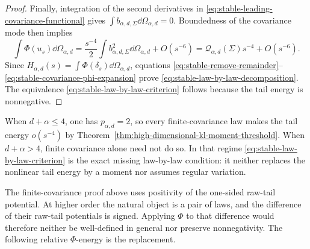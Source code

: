 \begin{proof}
Finally, integration of the second derivatives in
\eqref{eq:stable-leading-covariance-functional} gives
\(\int b_{\alpha,d,\Sigma}\dd\Omega_{\alpha,d}=0\).  Boundedness of the
covariance mode then implies
\begin{equation}\label{eq:stable-covariance-phi-expansion}
 \int\Phi(u_s)\dd\Omega_{\alpha,d}
 =\frac{s^{-4}}2\int b_{\alpha,d,\Sigma}^2\dd\Omega_{\alpha,d}
 +O(s^{-6})
 =\mathcal Q_{\alpha,d}(\Sigma)s^{-4}+O(s^{-6}).
\end{equation}
Since \(H_{\alpha,d}(s)=\int\Phi(\delta_s)\dd\Omega_{\alpha,d}\),
equations \eqref{eq:stable-remove-remainder}--
\eqref{eq:stable-covariance-phi-expansion} prove
\eqref{eq:stable-law-by-law-decomposition}.  The equivalence
\eqref{eq:stable-law-by-law-criterion} follows because the tail energy is
nonnegative.
\end{proof}

\begin{remark}
When \(d+\alpha\le4\), one has \(p_{\alpha,d}=2\), so every
finite-covariance law makes the tail energy \(o(s^{-4})\) by
Theorem~\ref{thm:high-dimensional-kl-moment-threshold}.  When
\(d+\alpha>4\), finite covariance alone need not do so.  In that regime
\eqref{eq:stable-law-by-law-criterion} is the exact missing law-by-law
condition: it neither replaces the nonlinear tail energy by a moment nor
assumes regular variation.
\end{remark}

The finite-covariance proof above uses positivity of the one-sided raw-tail
potential.  At higher order the natural object is a pair of laws, and the
difference of their raw-tail potentials is signed.  Applying \(\Phi\) to that
difference would therefore neither be well-defined in general nor preserve
nonnegativity.  The following relative \(\Phi\)-energy is the replacement.





